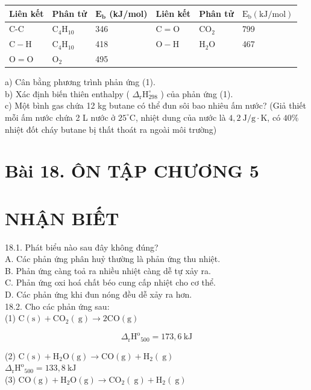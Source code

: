\documentclass[10pt]{article}
\begin{document}
\begin{center}
\begin{tabular}{|l|l|l|l|l|l|}
\hline
Liên kết & Phân tử & $\mathbf{E}_{\mathbf{b}}$ (kJ/mol) & Liên kết & Phân tử & $\mathrm{E}_{\mathrm{b}}(\mathrm{kJ} / \mathrm{mol})$ \\
\hline
C-C & $\mathrm{C}_{4} \mathrm{H}_{10}$ & 346 & $\mathrm{C}=\mathrm{O}$ & $\mathrm{CO}_{2}$ & 799 \\
\hline
$\mathrm{C}-\mathrm{H}$ & $\mathrm{C}_{4} \mathrm{H}_{10}$ & 418 & $\mathrm{O}-\mathrm{H}$ & $\mathrm{H}_{2} \mathrm{O}$ & 467 \\
\hline
$\mathrm{O}=\mathrm{O}$ & $\mathrm{O}_{2}$ & 495 &  &  &  \\
\hline
\end{tabular}
\end{center}

a) Cân bằng phương trình phản ứng (1).\\
b) Xác định biến thiên enthalpy ( $\Delta_{\mathrm{r}} \mathrm{H}_{298}^{\circ}$ ) của phản ứng (1).\\
c) Một bình gas chứa 12 kg butane có thể đun sôi bao nhiêu ấm nước? (Giả thiết mỗi ấm nước chứa 2 L nước ở $25^{\circ} \mathrm{C}$, nhiệt dung của nước là $4,2 \mathrm{~J} / \mathrm{g} \cdot \mathrm{K}$, có $40 \%$ nhiệt đốt cháy butane bị thất thoát ra ngoài môi trường)

\section*{Bài 18. ÔN TẬP CHƯƠNG 5}
\section*{NHẬN BIẾT}
18.1. Phát biểu nào sau đây không đúng?\\
A. Các phản ứng phân huỷ thường là phản ứng thu nhiệt.\\
B. Phản ứng càng toả ra nhiều nhiệt càng dễ tự xảy ra.\\
C. Phản ứng oxi hoá chất béo cung cấp nhiệt cho cơ thể.\\
D. Các phản ứng khi đun nóng đều dễ xảy ra hơn.\\
18.2. Cho các phản ứng sau:\\
(1) $\mathrm{C}(\mathrm{s})+\mathrm{CO}_{2}(\mathrm{~g}) \rightarrow 2 \mathrm{CO}(\mathrm{g})$

$$
\Delta_{\mathrm{r}} \mathrm{H}^{\mathrm{o}}{ }_{500}=173,6 \mathrm{~kJ}
$$

(2) $\mathrm{C}(\mathrm{s})+\mathrm{H}_{2} \mathrm{O}(\mathrm{g}) \rightarrow \mathrm{CO}(\mathrm{g})+\mathrm{H}_{2}(\mathrm{~g})$\\
$\Delta_{\mathrm{r}} \mathrm{H}^{\mathrm{o}}{ }_{500}=133,8 \mathrm{~kJ}$\\
(3) $\mathrm{CO}(\mathrm{g})+\mathrm{H}_{2} \mathrm{O}(\mathrm{g}) \rightarrow \mathrm{CO}_{2}(\mathrm{~g})+\mathrm{H}_{2}(\mathrm{~g})$
\end{document}
